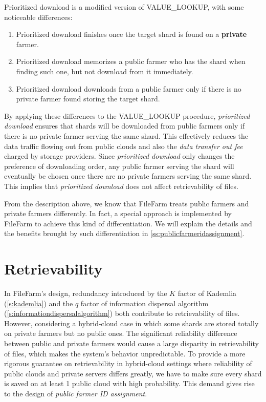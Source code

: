 Prioritized download is a modified version of VALUE\_LOOKUP, with some noticeable differences:

\begin{enumerate}
  \item Prioritized download finishes once the target shard is found on a \textbf{private} farmer.
  \item Prioritized download memorizes a public farmer who has the shard when finding such one, but not download from it immediately.
  \item Prioritized download downloads from a public farmer only if there is no private farmer found storing the target shard.
\end{enumerate}

By applying these differences to the VALUE\_LOOKUP procedure, \textit{prioritized download} ensures that shards will be downloaded from public farmers only if there is no private farmer serving the same shard. This effectively reduces the data traffic flowing out from public clouds and also the \textit{data transfer out fee} charged by storage providers. Since \textit{prioritized download} only changes the preference of downloading order, any public farmer serving the shard will eventually be chosen once there are no private farmers serving the same shard. This implies that \textit{prioritized download} does not affect retrievability of files.

From the description above, we know that FileFarm treats public farmers and private farmers differently. In fact, a special approach is implemented by FileFarm to achieve this kind of differentiation. We will explain the details and the benefits brought by such differentiation in \ref{ss:publicfarmeridassignment}.

\section{Retrievability}
\label{s:retrievability}

In FileFarm's design, redundancy introduced by the $K$ factor of Kademlia (\ref{s:kademlia}) and the $q$ factor of information dispersal algorithm (\ref{s:informationdispersalalgorithm}) both contribute to retrievability of files. However, considering a hybrid-cloud case in which some shards are stored totally on private farmers but no public ones. The significant reliability difference between public and private farmers would cause a large disparity in retrievability of files, which makes the system's behavior unpredictable. To provide a more rigorous guarantee on retrievability in hybrid-cloud settings where reliability of public clouds and private servers differs greatly, we have to make sure every shard is saved on at least 1 public cloud with high probability. This demand gives rise to the design of \textit{public farmer ID assignment}.

